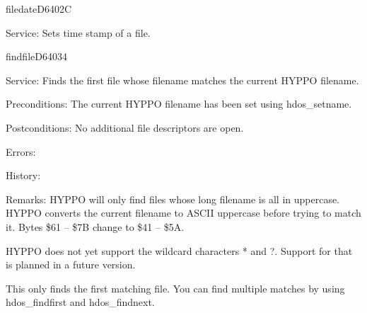 \newpage
\begin{hyppotrap}{filedate}{D640}{2C}
\item [Service:]
  Sets time stamp of a file.
\notimplemented
\end{hyppotrap}


%
\newpage
\begin{hyppotrap}{findfile}{D640}{34}
\item [Service:]
  Finds the first file whose filename matches the current HYPPO filename.
\item [Preconditions:]
  The current HYPPO filename has been set using hdos\_setname.
\item [Postconditions:]
  No additional file descriptors are open.
\item [Errors:]
\item [History:]
\item [Remarks:]
  HYPPO will only find files whose long filename is all in uppercase.
  HYPPO converts the current filename to ASCII uppercase before trying
  to match it. Bytes \$61 -- \$7B change to \$41 -- \$5A.

  HYPPO does not yet support the wildcard characters * and ?. Support
  for that is planned in a future version.

  This only finds the first matching file. You can find multiple matches by
  using hdos\_findfirst and hdos\_findnext.
\end{hyppotrap}


